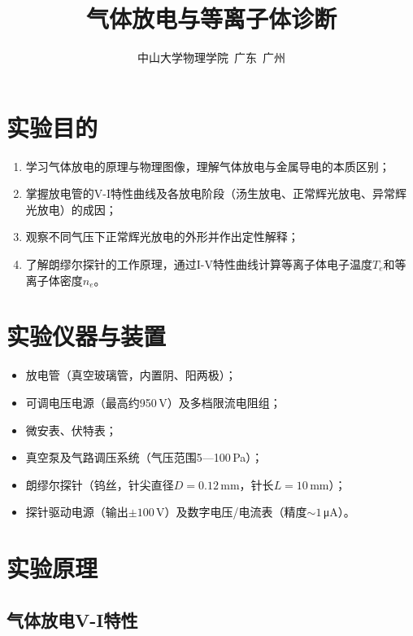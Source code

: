 \documentclass[a4paper,8pt,twocolumn]{article}
\title{
  \textbf{\huge 气体放电与等离子体诊断}
}
\author{
  \small 中山大学物理学院~广东~广州
}
\begin{document}
\maketitle
\newpage

\section{实验目的}

\begin{enumerate}
  \item 学习气体放电的原理与物理图像，理解气体放电与金属导电的本质区别；
  \item 掌握放电管的V-I特性曲线及各放电阶段（汤生放电、正常辉光放电、异常辉光放电）的成因；
  \item 观察不同气压下正常辉光放电的外形并作出定性解释；
  \item 了解朗缪尔探针的工作原理，通过I-V特性曲线计算等离子体电子温度$T_e$和等离子体密度$n_e$。
\end{enumerate}

\section{实验仪器与装置}

\begin{itemize}
  \item 放电管（真空玻璃管，内置阴、阳两极）；
  \item 可调电压电源（最高约950\,V）及多档限流电阻组；
  \item 微安表、伏特表；
  \item 真空泵及气路调压系统（气压范围5—100\,Pa）；
  \item 朗缪尔探针（钨丝，针尖直径$D=0.12$\,mm，针长$L=10$\,mm）；
  \item 探针驱动电源（输出$\pm100$\,V）及数字电压/电流表（精度$\sim1$\,\si{\micro\ampere}）。
\end{itemize}

\section{实验原理}

\subsection{气体放电V-I特性}
\end{document}
